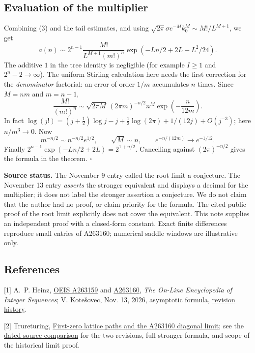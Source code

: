 \documentclass[11pt,a4paper]{article}
\numberwithin{equation}{section}
\theoremstyle{definition}
\theoremstyle{remark}
\begin{document}
\subsection*{Evaluation of the multiplier}
Combining (3) and the tail estimates, and using $\sqrt{2\pi}\sigma e^{-M}k_0^M\sim M!/L^{M+1}$, we get
\[
 a(n)\sim 2^{n-1}\frac{M!}{L^{M+1}(m!)^n}
                  \exp(-Ln/2+2L-L^2/24).
\]
The additive $1$ in the tree identity is negligible (for example $I\ge1$ and $2^n-2\to\infty$). The uniform Stirling calculation here needs the first correction for the \emph{denominator} factorial: an error of order $1/m$ accumulates $n$ times. Since $M=nm$ and $m=n-1$,
\[
 \frac{M!}{(m!)^n}
 \sim\sqrt{2\pi M}\,(2\pi m)^{-n/2}n^{M}
       \exp\!\left(-\frac{n}{12m}\right).
\]
In fact $\log(j!)=(j+\tfrac12)\log j-j+\tfrac12\log(2\pi)+1/(12j)+O(j^{-3})$; here $n/m^3\to0$. Now
\[
 m^{-n/2}\sim n^{-n/2}e^{1/2},\qquad
 \sqrt M\sim n,\qquad e^{-n/(12m)}\to e^{-1/12}.
\]
Finally $2^{n-1}\exp(-Ln/2+2L)=2^{1+n/2}$. Cancelling against $(2\pi)^{-n/2}$ gives the formula in the theorem. $\square$

\textbf{Source status.} The November 9 entry called the root limit a conjecture. The November 13 entry \emph{asserts} the stronger equivalent and displays a decimal for the multiplier; it does not label the stronger assertion a conjecture. We do not claim that the author had no proof, or claim priority for the formula. The cited public proof of the root limit explicitly does not cover the equivalent. This note supplies an independent proof with a closed-form constant. Exact finite differences reproduce small entries of A263160; numerical saddle windows are illustrative only.

\subsection*{References}
\small\raggedright
[1] A.~P. Heinz, \href{https://oeis.org/A263159}{OEIS A263159} and
\href{https://oeis.org/A263160}{A263160}, \emph{The On-Line Encyclopedia of Integer Sequences}; V. Kote\v{s}ovec, Nov. 13, 2026, asymptotic formula,
\href{https://oeis.org/A263160/history}{revision history}.

[2] Trureturing, \href{https://www.trureturing.org/research/oeis-a263160-first-zero-diagonal-limit/}{First-zero lattice paths and the A263160 diagonal limit}; see the
\href{https://the-omega-institute.github.io/trureturing-mdbook/Library/FiniteGeometry/kotesovec2026a263160.html}{dated source comparison} for the two revisions, full stronger formula, and scope of the historical limit proof.
\end{document}
